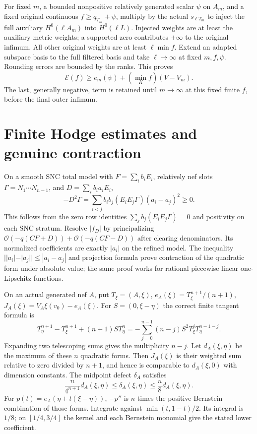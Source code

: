 \documentclass[10pt]{article}
\newcommand{\OO}{\mathcal O}
\begin{document}
For fixed $m$, a bounded nonpositive relatively generated scalar $\psi$
on $A_m$, and a fixed original continuous $f\geq q_{T_m}+\psi$,
multiply by the actual $s_{\ell T_m}$ to inject the full auxiliary
$H^0(\ell A_m)$ into $H^0(\ell L)$. Injected weights are at least the
auxiliary metric weights; a supported zero contributes $+\infty$ to
the original infimum. All other original weights are at least
$\ell\min f$. Extend an adapted subspace basis to the full filtered
basis and take $\ell\to\infty$ at fixed $m,f,\psi$. Rounding errors
are bounded by the ranks. This proves
\[
 \mathscr E(f)\geq e_m(\psi)+(\min_K f)(V-V_m).
 \tag{5.5}
\]
The last, generally negative, term is retained until $m\to\infty$ at
this fixed finite $f$, before the final outer infimum.

\section{Finite Hodge estimates and genuine contraction}
On a smooth SNC total model with $F=\sum_i b_iE_i$, relatively nef
slots $\Gamma=N_1\cdots N_{n-1}$, and $D=\sum_i b_i a_iE_i$,
\[
 -D^2\Gamma=\sum_{i<j}b_ib_j(E_iE_j\Gamma)(a_i-a_j)^2\geq0.
 \tag{6.1}
\]
This follows from the zero row identities
$\sum_j b_j(E_iE_j\Gamma)=0$ and positivity on each SNC stratum.
Resolve $|f_D|$ by principalizing
$\OO(-q(CF+D))+\OO(-q(CF-D))$ after clearing denominators.
Its normalized coefficients are exactly $|a_i|$ on the refined model.
The inequality $||a_i|-|a_j||\leq|a_i-a_j|$ and projection formula
prove contraction of the quadratic form under absolute value; the same
proof works for rational piecewise linear one-Lipschitz functions.

On an actual generated nef $A$, put $T_\xi=(A,\xi)$,
$e_A(\xi)=T_\xi^{n+1}/(n+1)$, $J_A(\xi)=V_A\xi(v_0)-e_A(\xi)$.
For $S=(0,\xi-\eta)$ the correct finite tangent formula is
\[
 T_\eta^{n+1}-T_\xi^{n+1}+(n+1)ST_\eta^n
 =-\sum_{j=0}^{n-1}(n-j)S^2T_\xi^jT_\eta^{n-1-j}.
 \tag{6.2}
\]
Expanding two telescoping sums gives the multiplicity $n-j$.
Let $d_A(\xi,\eta)$ be the maximum of these $n$ quadratic forms.
Then $J_A(\xi)$ is their weighted sum relative to zero divided by
$n+1$, and hence is comparable to $d_A(\xi,0)$ with dimension constants.
The midpoint defect $\delta_A$ satisfies
\[
 \frac{n}{4^{n+1}}d_A(\xi,\eta)\leq\delta_A(\xi,\eta)
 \leq\frac n8 d_A(\xi,\eta).
 \tag{6.3}
\]
For $p(t)=e_A(\eta+t(\xi-\eta))$, $-p''$ is $n$ times the positive
Bernstein combination of those forms. Integrate against
$\min(t,1-t)/2$. Its integral is $1/8$; on $[1/4,3/4]$ the kernel
and each Bernstein monomial give the stated lower coefficient.
\end{document}

